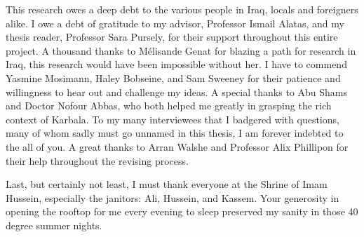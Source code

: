 This research owes a deep debt to the various people in Iraq, locals and foreigners alike. I owe a debt of gratitude to my advisor, Professor Ismail Alatas, and my thesis reader, Professor Sara Pursely, for their support throughout this entire project.
A thousand thanks to Mélisande Genat for blazing a path for research in Iraq, this research would have been impossible without her. I have to commend Yasmine Mosimann, Haley Bobseine, and Sam Sweeney for their patience and willingness to hear out and challenge my ideas. A special thanks to Abu Shams and Doctor Nofour Abbas, who both helped me greatly in grasping the rich context of Karbala. To my many interviewees that I badgered with questions, many of whom sadly must go unnamed in this thesis, I am forever indebted to the all of you. A great thanks to Arran Walshe and Professor Alix Phillipon for their help throughout the revising process.

Last, but certainly not least, I must thank everyone at the Shrine of Imam Hussein, especially the janitors: Ali, Hussein, and Kassem. Your generosity in opening the rooftop for me every evening to sleep preserved my sanity in those 40 degree summer nights. 